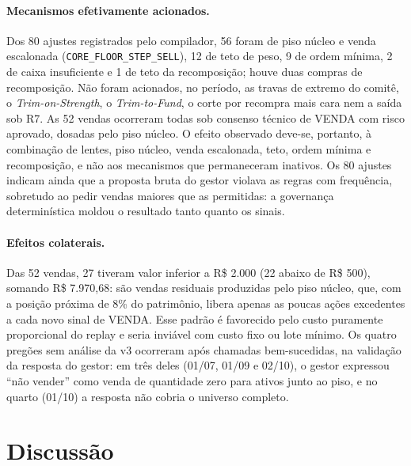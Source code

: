 \documentclass{eic-bcc-tcc}
\begin{document}
\paragraph{Mecanismos efetivamente acionados.} Dos 80 ajustes registrados pelo compilador, 56 foram de piso núcleo e venda escalonada (\texttt{CORE\_FLOOR\_STEP\_SELL}), 12 de teto de peso, 9 de ordem mínima, 2 de caixa insuficiente e 1 de teto da recomposição; houve duas compras de recomposição. Não foram acionados, no período, as travas de extremo do comitê, o \textit{Trim-on-Strength}, o \textit{Trim-to-Fund}, o corte por recompra mais cara nem a saída sob R7. As 52 vendas ocorreram todas sob consenso técnico de VENDA com risco aprovado, dosadas pelo piso núcleo. O efeito observado deve-se, portanto, à combinação de lentes, piso núcleo, venda escalonada, teto, ordem mínima e recomposição, e não aos mecanismos que permaneceram inativos. Os 80 ajustes indicam ainda que a proposta bruta do gestor violava as regras com frequência, sobretudo ao pedir vendas maiores que as permitidas: a governança determinística moldou o resultado tanto quanto os sinais.

\paragraph{Efeitos colaterais.} Das 52 vendas, 27 tiveram valor inferior a R\$ 2.000 (22 abaixo de R\$ 500), somando R\$ 7.970,68: são vendas residuais produzidas pelo piso núcleo, que, com a posição próxima de 8\% do patrimônio, libera apenas as poucas ações excedentes a cada novo sinal de VENDA. Esse padrão é favorecido pelo custo puramente proporcional do replay e seria inviável com custo fixo ou lote mínimo. Os quatro pregões sem análise da v3 ocorreram após chamadas bem-sucedidas, na validação da resposta do gestor: em três deles (01/07, 01/09 e 02/10), o gestor expressou ``não vender'' como venda de quantidade zero para ativos junto ao piso, e no quarto (01/10) a resposta não cobria o universo completo.

\section{Discussão}
\label{sec:res-discussao}
\end{document}
